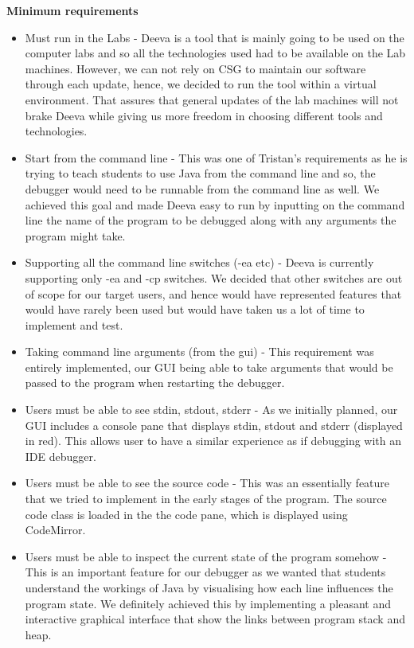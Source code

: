 \documentclass[11pt, a4paper]{article}
\begin{document}
\textbf{Minimum requirements}
\begin{itemize}
\item Must run in the Labs - Deeva is a tool that is mainly going to be used on the computer labs and so all the technologies used had to be available on the Lab machines. However, we can not rely on CSG to maintain our software through each update, hence, we decided to run the tool within a virtual environment. That assures that general updates of the lab machines will not brake Deeva while giving us more freedom in choosing different tools and technologies.
\item Start from the command line - This was one of Tristan's requirements as he is trying to teach students to use Java from the command line and so, the debugger would need to be runnable from the command line as well. We achieved this goal and made Deeva easy to run by inputting on the command line the name of the program to be debugged along with any arguments the program might take.
\item Supporting all the command line switches (-ea etc) - Deeva is currently supporting only -ea and -cp switches. We decided that other switches are out of scope for our target users, and hence would have represented features that would have rarely been used but would have taken us a lot of time to implement and test.
\item Taking command line arguments (from the gui) - This requirement was entirely implemented, our GUI being able to take arguments that would be passed to the program when restarting the debugger.
\item Users must be able to see stdin, stdout, stderr - As we initially planned, our GUI includes a console pane that displays stdin, stdout and stderr (displayed in red). This allows user to have a similar experience as if debugging with an IDE debugger.
\item Users must be able to see the source code - This was an essentially feature that we tried to implement in the early stages of the program. The source code class is loaded in the the code pane, which is displayed using CodeMirror.
\item Users must be able to inspect the current state of the program somehow - This is an important feature for our debugger as we wanted that students understand the workings of Java by visualising how each line influences the program state. We definitely achieved this by implementing a pleasant and interactive graphical interface that show the links between program stack and heap.

\end{itemize}
\end{document}
